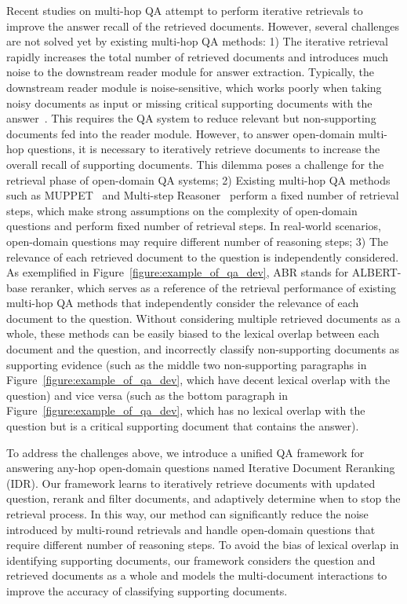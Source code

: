\documentclass[sigconf]{acmart}
\begin{document}
Recent studies on multi-hop QA attempt to perform iterative retrievals to improve the answer recall of the retrieved documents. However, several challenges are not solved yet by existing multi-hop QA methods: 1) The iterative retrieval rapidly increases the total number of retrieved documents and introduces much noise to the downstream reader module for answer extraction. Typically, the downstream reader module is noise-sensitive, which works poorly when taking noisy documents as input or missing critical supporting documents with the answer~\cite{nie-etal-2019-revealing}. This requires the QA system to reduce relevant but non-supporting documents fed into the reader module. However, to answer open-domain multi-hop questions, it is necessary to iteratively retrieve documents to increase the overall recall of supporting documents. This dilemma poses a challenge for the retrieval phase of open-domain QA systems; 2) Existing multi-hop QA methods such as MUPPET~\cite{feldman-el-yaniv-2019-multi} and Multi-step Reasoner~\cite{das2018multistep} perform a fixed number of retrieval steps, which make strong assumptions on the complexity of open-domain questions and perform fixed number of retrieval steps. In real-world scenarios, open-domain questions may require different number of reasoning steps; 3) The relevance of each retrieved document to the question is independently considered. As exemplified in Figure~\ref{figure:example_of_qa_dev}, ABR stands for ALBERT-base reranker, which serves as a reference of the retrieval performance of existing multi-hop QA methods that independently consider the relevance of each document to the question. Without considering multiple retrieved documents as a whole, these methods can be easily biased to the lexical overlap between each document and the question, and incorrectly classify non-supporting documents as supporting evidence (such as the middle two non-supporting paragraphs in Figure~\ref{figure:example_of_qa_dev}, which have decent lexical overlap with the question) and vice versa (such as the bottom paragraph in Figure~\ref{figure:example_of_qa_dev}, which has no lexical overlap with the question but is a critical supporting document that contains the answer).


To address the challenges above, we introduce a unified QA framework for answering any-hop open-domain questions named Iterative Document Reranking (IDR). Our framework learns to iteratively retrieve documents with updated question, rerank and filter documents, and adaptively determine when to stop the retrieval process. In this way, our method can significantly reduce the noise introduced by multi-round retrievals and handle open-domain questions that require different number of reasoning steps. To avoid the bias of lexical overlap in identifying supporting documents, our framework considers the question and retrieved documents as a whole and models the multi-document interactions to improve the accuracy of classifying supporting documents.
\end{document}
